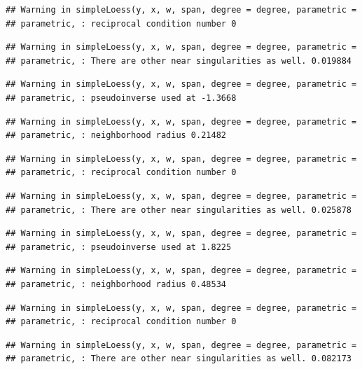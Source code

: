\documentclass[]{article}
\begin{document}
\begin{verbatim}
## Warning in simpleLoess(y, x, w, span, degree = degree, parametric =
## parametric, : reciprocal condition number 0
\end{verbatim}

\begin{verbatim}
## Warning in simpleLoess(y, x, w, span, degree = degree, parametric =
## parametric, : There are other near singularities as well. 0.019884
\end{verbatim}

\begin{verbatim}
## Warning in simpleLoess(y, x, w, span, degree = degree, parametric =
## parametric, : pseudoinverse used at -1.3668
\end{verbatim}

\begin{verbatim}
## Warning in simpleLoess(y, x, w, span, degree = degree, parametric =
## parametric, : neighborhood radius 0.21482
\end{verbatim}

\begin{verbatim}
## Warning in simpleLoess(y, x, w, span, degree = degree, parametric =
## parametric, : reciprocal condition number 0
\end{verbatim}

\begin{verbatim}
## Warning in simpleLoess(y, x, w, span, degree = degree, parametric =
## parametric, : There are other near singularities as well. 0.025878
\end{verbatim}

\begin{verbatim}
## Warning in simpleLoess(y, x, w, span, degree = degree, parametric =
## parametric, : pseudoinverse used at 1.8225
\end{verbatim}

\begin{verbatim}
## Warning in simpleLoess(y, x, w, span, degree = degree, parametric =
## parametric, : neighborhood radius 0.48534
\end{verbatim}

\begin{verbatim}
## Warning in simpleLoess(y, x, w, span, degree = degree, parametric =
## parametric, : reciprocal condition number 0
\end{verbatim}

\begin{verbatim}
## Warning in simpleLoess(y, x, w, span, degree = degree, parametric =
## parametric, : There are other near singularities as well. 0.082173
\end{verbatim}
\end{document}
